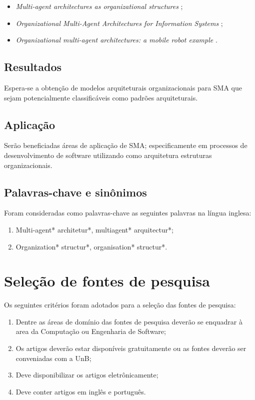 \begin{itemize}
    \item \textit{Multi-agent architectures as organizational structures} \cite{kolp2006};
    \item \textit{Organizational Multi-Agent Architectures for Information Systems} \cite{do2003};
    \item \textit{Organizational multi-agent architectures: a mobile robot example} \cite{kolp2002}.
\end{itemize}


\subsection{Resultados}
Espera-se a obtenção de modelos arquiteturais organizacionais para SMA que sejam potencialmente classificáveis como padrões arquiteturais.

\subsection{Aplicação}
Serão beneficiadas áreas de aplicação de SMA; especificamente em processos de desenvolvimento de software utilizando como arquitetura estruturas organizacionais. 


\subsection{Palavras-chave e sinônimos}

Foram consideradas como palavras-chave as seguintes palavras na língua inglesa:

\begin{enumerate}
    \item Multi-agent* architetur*, multiagent* arquitectur*;
    \item Organization* structur*, organisation* structur*.
\end{enumerate}

\section{Seleção de fontes de pesquisa}
Os seguintes critérios foram adotados para a seleção das fontes de pesquisa:

\begin{enumerate}
    \item Dentre as áreas de domínio das fontes de pesquisa deverão se enquadrar à area da Computação ou Engenharia de Software;
    \item Os artigos deverão estar disponíveis gratuitamente ou as fontes deverão ser conveniadas com a UnB;
    \item Deve disponibilizar os artigos eletrônicamente;
    \item Deve conter artigos em inglês e português.
\end{enumerate}

